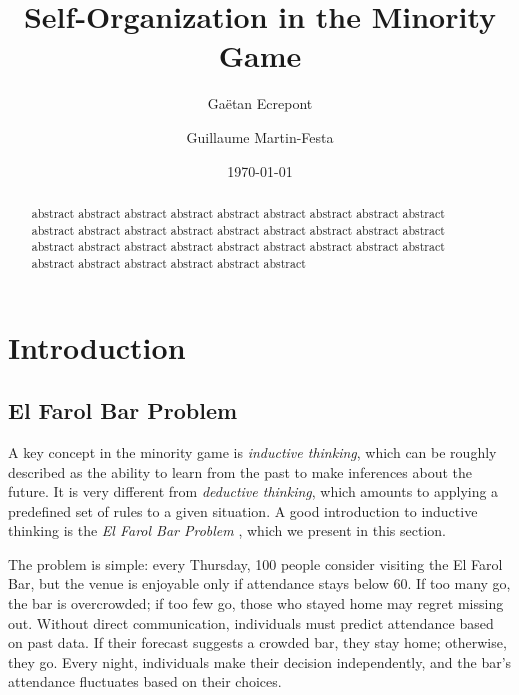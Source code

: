 \documentclass[a4paper, amsfonts, amssymb, amsmath, reprint, showkeys, nofootinbib, twoside]{revtex4-1}
\begin{document}
\title{Self-Organization in the Minority Game}

\author{Gaëtan Ecrepont}
\author{Guillaume Martin-Festa}

\date{\today} %

\begin{abstract}
    abstract abstract abstract abstract abstract abstract abstract abstract abstract abstract abstract abstract abstract abstract abstract abstract abstract abstract abstract abstract abstract abstract abstract abstract abstract abstract abstract abstract abstract abstract abstract abstract abstract 
\end{abstract}


\maketitle


\section{Introduction}
\label{sec:introduction}

\subsection{El Farol Bar Problem}
A key concept in the minority game is \textit{inductive thinking}, which can be roughly described as the ability to learn from the past to make inferences about the future. It is very different from \textit{deductive thinking}, which amounts to applying a predefined set of rules to a given situation. A good introduction to inductive thinking is the \textit{El Farol Bar Problem} \cite{Arthur_1994}, which we present in this section.

The problem is simple: every Thursday, 100 people consider visiting the El Farol Bar, but the venue is enjoyable only if attendance stays below 60. If too many go, the bar is overcrowded; if too few go, those who stayed home may regret missing out. Without direct communication, individuals must predict attendance based on past data. If their forecast suggests a crowded bar, they stay home; otherwise, they go. Every night, individuals make their decision independently, and the bar's attendance fluctuates based on their choices.
\end{document}
